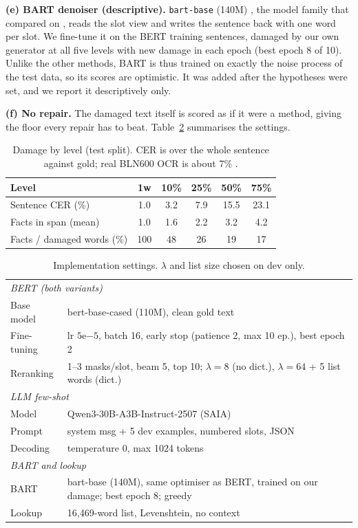 \textbf{(e) BART denoiser (descriptive).} \texttt{bart-base} (140M) \citep{lewis2020bart}, the model family that
\citet{thomas2024leveraging} compared on \bln{}, reads the slot view and writes the sentence back with one word per
slot. We fine-tune it on the BERT training sentences, damaged by our own generator at all five levels with new
damage in each epoch (best epoch 8 of 10). Unlike the other methods, BART is thus trained on exactly the noise
process of the test data, so its scores are optimistic. It was added after the hypotheses were set, and we report it
descriptively only.

\textbf{(f) No repair.} The damaged text itself is scored as if it were a method, giving the floor every repair has
to beat. Table~\ref{tab:settings} summarises the settings.

\begin{table}[t]
\centering
\small\setlength{\tabcolsep}{3pt}
\begin{tabular}{lccccc}
\toprule
Level & 1w & 10\% & 25\% & 50\% & 75\% \\
\midrule
Sentence CER (\%) & 1.0 & 3.2 & 7.9 & 15.5 & 23.1 \\
Facts in span (mean) & 1.0 & 1.6 & 2.2 & 3.2 & 4.2 \\
Facts / damaged words (\%) & 100 & 48 & 26 & 19 & 17 \\
\bottomrule
\end{tabular}
\caption{Damage by level (test split). CER is over the whole sentence against gold; real BLN600 OCR is about 7\% \citep{booth-etal-2024-bln600}.}
\label{tab:damage}
\end{table}

\begin{table}[t]
\centering
\small\setlength{\tabcolsep}{3pt}
\begin{tabular}{p{2.1cm}p{4.9cm}}
\toprule
\multicolumn{2}{l}{\textit{BERT (both variants)}} \\
Base model & bert-base-cased (110M), clean gold text \\
Fine-tuning & lr $5\mathrm{e}{-5}$, batch 16, early stop (patience 2, max 10 ep.), best epoch 2 \\
Reranking & 1--3 masks/slot, beam 5, top 10; $\lambda=8$ (no dict.), $\lambda=64$ + 5 list words (dict.) \\
\midrule
\multicolumn{2}{l}{\textit{LLM few-shot}} \\
Model & Qwen3-30B-A3B-Instruct-2507 (SAIA) \\
Prompt & system msg + 5 dev examples, numbered slots, JSON \\
Decoding & temperature 0, max 1024 tokens \\
\midrule
\multicolumn{2}{l}{\textit{BART and lookup}} \\
BART & bart-base (140M), same optimiser as BERT, trained on our damage; best epoch 8; greedy \\
Lookup & 16,469-word list, Levenshtein, no context \\
\bottomrule
\end{tabular}
\caption{Implementation settings. $\lambda$ and list size chosen on dev only.}
\label{tab:settings}
\end{table}